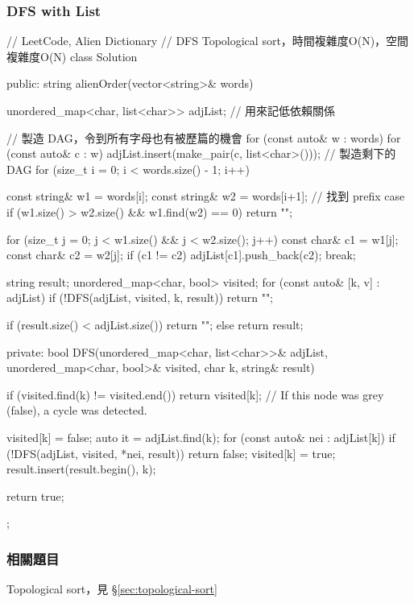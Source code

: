 \subsubsection{DFS with List}
\begin{Code}
// LeetCode, Alien Dictionary
// DFS Topological sort，時間複雜度O(N)，空間複雜度O(N)
class Solution {
public:
    string alienOrder(vector<string>& words) {
        unordered_map<char, list<char>> adjList; // 用來記低依賴關係
        
        // 製造 DAG，令到所有字母也有被歷篇的機會
        for (const auto& w : words)
            for (const auto& c : w)
                adjList.insert(make_pair(c, list<char>()));
        // 製造剩下的 DAG
        for (size_t i = 0; i < words.size() - 1; i++)
        {
            const string& w1 = words[i];
            const string& w2 = words[i+1];
            // 找到 prefix case
            if (w1.size() > w2.size() && w1.find(w2) == 0) return "";
            
            for (size_t j = 0; j < w1.size() && j < w2.size(); j++)
            {
                const char& c1 = w1[j];
                const char& c2 = w2[j];
                if (c1 != c2)
                {
                    adjList[c1].push_back(c2);
                    break;
                }
            }
        }
        
        string result;
        unordered_map<char, bool> visited;
        for (const auto& [k, v] : adjList)
        {
            if (!DFS(adjList, visited, k, result))
                return "";
        }
        
        if (result.size() < adjList.size())
            return "";
        else
            return result;
    }
private:
    bool DFS(unordered_map<char, list<char>>& adjList, unordered_map<char, bool>& visited, char k, string& result)
    {
        if (visited.find(k) != visited.end())
            return visited[k]; // If this node was grey (false), a cycle was detected.
        
        visited[k] = false;
        auto it = adjList.find(k);
        for (const auto& nei : adjList[k])
        {
            if (!DFS(adjList, visited, *nei, result)) return false;
        }
        visited[k] = true;
        result.insert(result.begin(), k);
        
        return true;
    }
};

\end{Code}

\subsubsection{相關題目}
\begindot
\item Topological sort，見 \S \ref{sec:topological-sort}
\myenddot
